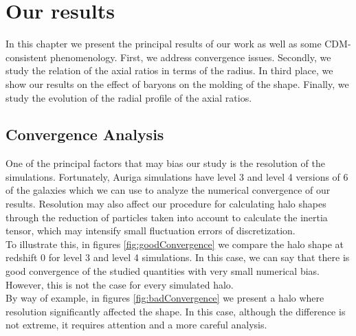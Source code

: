 \chapter{Our results}

In this chapter we present the principal results of our work as well as some CDM-consistent phenomenology. First, we address convergence issues. Secondly, we study the relation of the axial ratios in terms of the radius. In third place, we show our results on the effect of baryons on the molding of the shape. Finally, we study the evolution of the radial profile of the axial ratios. 

\section{Convergence Analysis}
One of the principal factors that may bias our study is the resolution of the simulations. Fortunately, Auriga simulations have level 3 and level 4 versions of 6 of the galaxies which we can use to analyze the numerical convergence of our results. Resolution may also affect our procedure for calculating halo shapes through the reduction of particles taken into account to calculate the inertia tensor, which may intensify small fluctuation errors of discretization.\\

To illustrate this, in figures \ref{fig:goodConvergence} we compare the halo shape at redshift 0 for level 3 and level 4 simulations. In this case, we can say that there is good convergence of the studied quantities with very small numerical bias. However, this is not the case for every simulated halo.\\

 By way of example, in figures \ref{fig:badConvergence} we present a halo where resolution significantly affected the shape. In this case, although the difference is not extreme, it requires attention and a more careful analysis.\\

